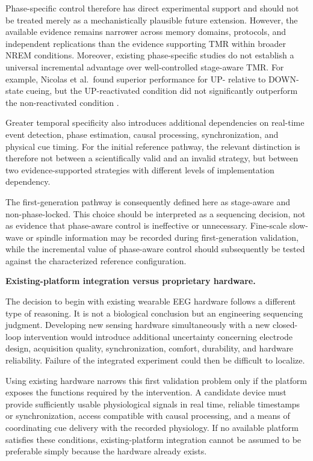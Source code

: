 Phase-specific control therefore has direct experimental support and should not
be treated merely as a mechanistically plausible future extension. However,
the available evidence remains narrower across memory domains, protocols, and
independent replications than the evidence supporting TMR within broader NREM
conditions. Moreover, existing phase-specific studies do not establish a
universal incremental advantage over well-controlled stage-aware TMR. For
example, Nicolas et al.\ found superior performance for UP- relative to
DOWN-state cueing, but the UP-reactivated condition did not significantly
outperform the non-reactivated condition \citep{nicolas2025phase}.

Greater temporal specificity also introduces additional dependencies on
real-time event detection, phase estimation, causal processing,
synchronization, and physical cue timing. For the initial reference pathway,
the relevant distinction is therefore not between a scientifically valid and
an invalid strategy, but between two evidence-supported strategies with
different levels of implementation dependency.

The first-generation pathway is consequently defined here as stage-aware and
non-phase-locked. This choice should be interpreted as a sequencing decision,
not as evidence that phase-aware control is ineffective or unnecessary.
Fine-scale slow-wave or spindle information may be recorded during
first-generation validation, while the incremental value of phase-aware control
should subsequently be tested against the characterized reference
configuration.


\noindent\textbf{Existing-platform integration versus proprietary hardware.}

The decision to begin with existing wearable EEG hardware follows a different
type of reasoning. It is not a biological conclusion but an engineering
sequencing judgment. Developing new sensing hardware simultaneously with a new
closed-loop intervention would introduce additional uncertainty concerning
electrode design, acquisition quality, synchronization, comfort, durability,
and hardware reliability. Failure of the integrated experiment could then be
difficult to localize.

Using existing hardware narrows this first validation problem only if the
platform exposes the functions required by the intervention. A candidate device
must provide sufficiently usable physiological signals in real time, reliable
timestamps or synchronization, access compatible with causal processing, and a
means of coordinating cue delivery with the recorded physiology. If no
available platform satisfies these conditions, existing-platform integration
cannot be assumed to be preferable simply because the hardware already exists.

